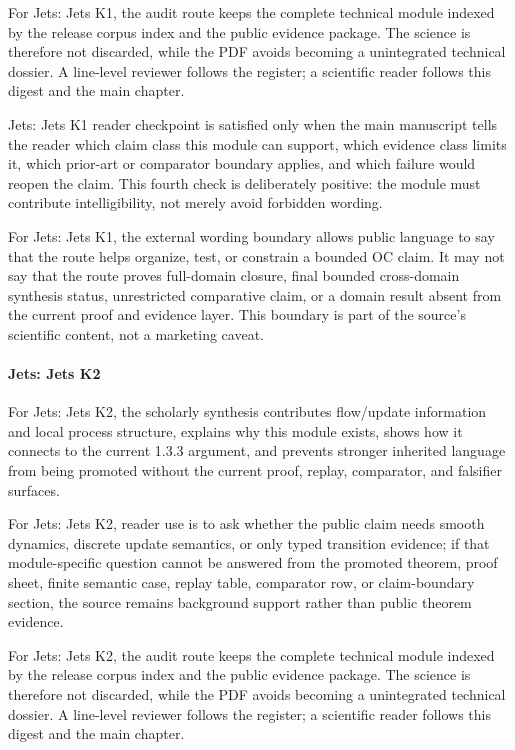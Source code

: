 For Jets: Jets K1, the audit route keeps the complete technical module indexed by the release corpus index and the public evidence package. The science is therefore not discarded, while the PDF avoids becoming a unintegrated technical dossier. A line-level reviewer follows the register; a scientific reader follows this digest and the main chapter.


Jets: Jets K1 reader checkpoint is satisfied only when the main manuscript tells the reader which claim class this module can support, which evidence class limits it, which prior-art or comparator boundary applies, and which failure would reopen the claim. This fourth check is deliberately positive: the module must contribute intelligibility, not merely avoid forbidden wording.


For Jets: Jets K1, the external wording boundary allows public language to say that the route helps organize, test, or constrain a bounded OC claim. It may not say that the route proves full-domain closure, final bounded cross-domain synthesis status, unrestricted comparative claim, or a domain result absent from the current proof and evidence layer. This boundary is part of the source's scientific content, not a marketing caveat.


\paragraph{Jets: Jets K2}

For Jets: Jets K2, the scholarly synthesis contributes flow/update information and local process structure, explains why this module exists, shows how it connects to the current 1.3.3 argument, and prevents stronger inherited language from being promoted without the current proof, replay, comparator, and falsifier surfaces.


For Jets: Jets K2, reader use is to ask whether the public claim needs smooth dynamics, discrete update semantics, or only typed transition evidence; if that module-specific question cannot be answered from the promoted theorem, proof sheet, finite semantic case, replay table, comparator row, or claim-boundary section, the source remains background support rather than public theorem evidence.


For Jets: Jets K2, the audit route keeps the complete technical module indexed by the release corpus index and the public evidence package. The science is therefore not discarded, while the PDF avoids becoming a unintegrated technical dossier. A line-level reviewer follows the register; a scientific reader follows this digest and the main chapter.


